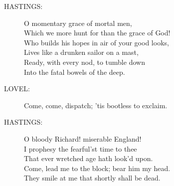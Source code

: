 \documentclass{article}
\begin{document}
\begin{description}
\item[HASTINGS:] 
\hspace{1pt}O momentary grace of mortal men,\\
\hspace{1pt}Which we more hunt for than the grace of God!\\
\hspace{1pt}Who builds his hopes in air of your good looks,\\
\hspace{1pt}Lives like a drunken sailor on a mast,\\
\hspace{1pt}Ready, with every nod, to tumble down\\
\hspace{1pt}Into the fatal bowels of the deep.\\
\end{description}
\begin{description}
\item[LOVEL:] 
\hspace{1pt}Come, come, dispatch; 'tis bootless to exclaim.\\
\end{description}
\begin{description}
\item[HASTINGS:] 
\hspace{1pt}O bloody Richard! miserable England!\\
\hspace{1pt}I prophesy the fearful'st time to thee\\
\hspace{1pt}That ever wretched age hath look'd upon.\\
\hspace{1pt}Come, lead me to the block; bear him my head.\\
\hspace{1pt}They smile at me that shortly shall be dead.\\
\end{description}
\centering{\it [Exeunt]}\\
\end{document}

